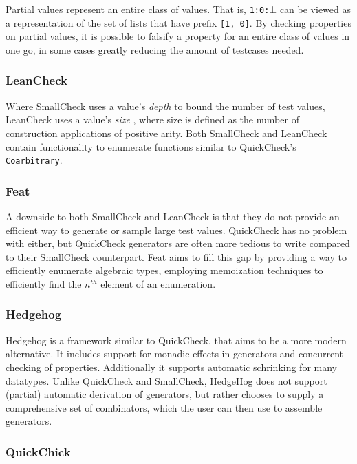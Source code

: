 \documentclass[a4paper,msc,twosized=semi]{uustthesis}
\begin{document}
  Partial values represent an entire class of values. That is, \texttt{1:0:$\bot$} can 
  be viewed as a representation of the set of lists that have prefix \texttt{[1, 0]}. 
  By checking properties on partial values, it is possible to falsify a property for 
  an entire class of values in one go, in some cases greatly reducing the amount of 
  testcases needed. 

\subsubsection{LeanCheck} 

  Where SmallCheck uses a value's \textit{depth} to bound the number of test values, 
  LeanCheck uses a value's \textit{size} \cite{matela2017tools}, where size is defined 
  as the number of construction applications of positive arity. Both SmallCheck and 
  LeanCheck contain functionality to enumerate functions similar to QuickCheck's 
  \texttt{Coarbitrary}. 

\subsubsection{Feat}

  A downside to both SmallCheck and LeanCheck is that they do not provide an efficient 
  way to generate or sample large test values. QuickCheck has no problem with either, 
  but QuickCheck generators are often more tedious to write compared to their 
  SmallCheck counterpart. Feat \cite{duregaard2013feat} aims to fill this gap by 
  providing a way to efficiently enumerate algebraic types, employing memoization 
  techniques to efficiently find the $n^{th}$ element of an enumeration. 

\subsubsection{Hedgehog}

  Hedgehog \cite{hedgehog} is a framework similar to QuickCheck, that aims to be a 
  more modern alternative. It includes support for monadic effects in generators and 
  concurrent checking of properties. Additionally it supports automatic schrinking for many datatypes. Unlike QuickCheck and SmallCheck, HedgeHog does not support (partial) automatic derivation of generators, but rather chooses to supply a comprehensive set of combinators, which the user can then use to assemble generators.

\subsubsection{QuickChick} 
\end{document}
